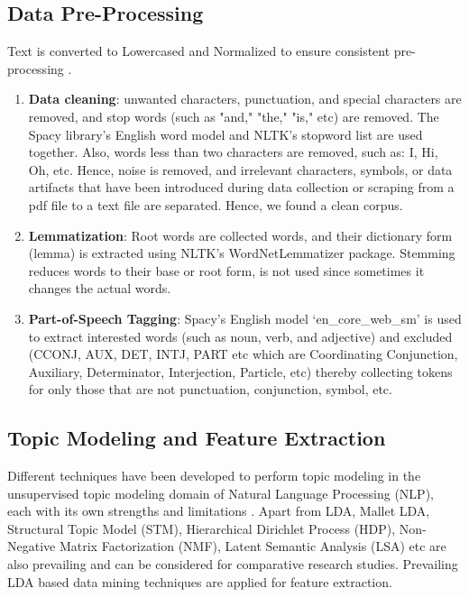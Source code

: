 \documentclass[sn-mathphys,Numbered]{sn-jnl}%
\theoremstyle{thmstyleone}%
\theoremstyle{thmstyletwo}%
\theoremstyle{thmstylethree}%
\begin{document}
\subsection{Data Pre-Processing}\label{data_pre} 
Text is converted to Lowercased and Normalized to ensure consistent pre-processing \cite{kao_natural_2007}. 
\begin{enumerate}[label=(\roman*)]
\item \textbf{Data cleaning}: unwanted characters, punctuation, and special characters are removed, and stop words (such as "and," "the," "is," etc) are removed. The Spacy library's English word model and NLTK's stopword list are used together. Also, words less than two characters are removed, such as: I, Hi, Oh, etc. Hence, noise is removed, and irrelevant characters, symbols, or data artifacts that have been introduced during data collection or scraping from a pdf file to a text file are separated. Hence, we found a clean corpus. 
\item \textbf{Lemmatization}: Root words are collected words, and their dictionary form (lemma) is extracted using NLTK's WordNetLemmatizer package. Stemming reduces words to their base or root form, is not used since sometimes it changes the actual words. \item \textbf{Part-of-Speech Tagging}: Spacy's English model `en\_core\_web\_sm' is used to extract interested words (such as noun, verb, and adjective) and excluded (CCONJ, AUX, DET, INTJ, PART etc which are Coordinating Conjunction, Auxiliary, Determinator, Interjection, Particle, etc) thereby collecting tokens for only those that are not punctuation, conjunction, symbol, etc. \end{enumerate} 

\subsection{Topic Modeling and Feature Extraction}\label{top_mod_feature} Different techniques have been developed to perform topic modeling in the unsupervised topic modeling domain of Natural Language Processing (NLP), each with its own strengths and limitations \cite{vayansky2020review, abdelrazek2022topic, yi2009comparative}. Apart from LDA, Mallet LDA, Structural Topic Model (STM), Hierarchical Dirichlet Process (HDP), Non-Negative Matrix Factorization (NMF), Latent Semantic Analysis (LSA) etc are also prevailing and can be considered for comparative research studies. Prevailing LDA based data mining techniques are applied for feature extraction. 
\end{document}
